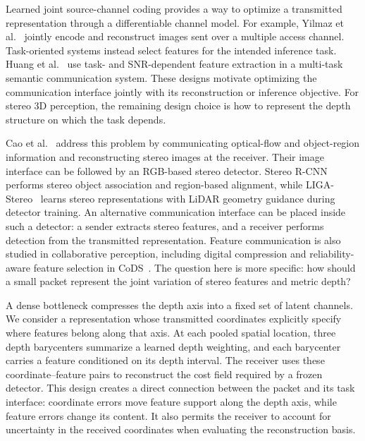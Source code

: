 \documentclass[conference]{IEEEtran}
\begin{document}
Learned joint source-channel coding provides a way to optimize a transmitted
representation through a differentiable channel model. For example,
Yilmaz et al.~\cite{yilmaz} jointly encode and reconstruct images sent over a
multiple access channel. Task-oriented systems instead select features for
the intended inference task. Huang et al.~\cite{huang} use task- and
SNR-dependent feature extraction in a multi-task semantic communication
system. These designs motivate optimizing the communication interface
jointly with its reconstruction or inference objective. For stereo 3D
perception, the remaining design choice is how to represent the depth
structure on which the task depends.

Cao et al.~\cite{cao} address this problem by communicating optical-flow and
object-region information and reconstructing stereo images at the receiver.
Their image interface can be followed by an RGB-based stereo detector.
Stereo R-CNN~\cite{stereo} performs stereo object association and
region-based alignment, while LIGA-Stereo~\cite{liga} learns stereo
representations with LiDAR geometry guidance during detector training.
An alternative communication interface can be placed inside such a detector:
a sender extracts stereo features, and a receiver performs detection from
the transmitted representation. Feature communication is also studied in
collaborative perception, including digital compression and reliability-aware
feature selection in CoDS~\cite{cods}. The question here is more specific:
how should a small packet represent the joint variation of stereo features
and metric depth?

A dense bottleneck compresses the depth axis into a fixed set of latent
channels. We consider a representation whose transmitted coordinates
explicitly specify where features belong along that axis. At each pooled
spatial location, three depth barycenters summarize a learned depth
weighting, and each barycenter carries a feature conditioned on its depth
interval. The receiver uses these coordinate--feature pairs to reconstruct
the cost field required by a frozen detector. This design creates a direct
connection between the packet and its task interface: coordinate errors
move feature support along the depth axis, while feature errors change its
content. It also permits the receiver to account for uncertainty in the
received coordinates when evaluating the reconstruction basis.
\end{document}
